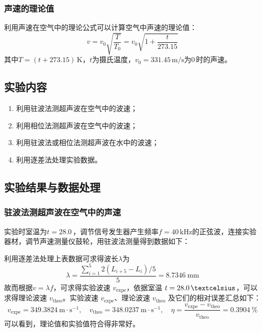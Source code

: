 \documentclass[UTF8]{article}
\theoremstyle{MyLineTheoremStyle} %
\theoremstyle{MyBlockTheoremStyle} %
\theoremstyle{MySubsubsectionStyle} %
\begin{document}
\subsubsection{声速的理论值}
利用声速在空气中的理论公式可以计算空气中声速的理论值：
\begin{equation}
v=v_0\sqrt{\frac{T}{T_0}}=v_0\sqrt{1+\frac{t}{273.15}}
\end{equation}
其中$ T=(t+273.15)\,\mathrm K $，$ t $为摄氏温度，$ v_0=331.45\,\mathrm{m/s} $为$ 0 $\,\textcelsius 时的声速。

\subsection{实验内容}
\begin{enumerate}
\item 利用驻波法测超声波在空气中的波速；
\item 利用相位法测超声波在空气中的波速；
\item 利用驻波法或相位法测超声波在水中的波速；
\item 利用逐差法处理实验数据。
\end{enumerate}

\subsection{实验结果与数据处理}
\subsubsection{驻波法测超声波在空气中的声速}
实验时室温为$ t=28.0 $\,\textcelsius，调节信号发生器产生频率$ f=40\,\mathrm{kHz} $的正弦波，连接实验器材，调节声速测量仪鼓轮，用驻波法测量得到数据如下：
\begin{table}[H]\centering
    \caption{驻波法求空气中声波波速}
    \label{驻波法求空气中声波波速}
\end{table}
利用逐差法处理上表数据可求得波长$ \lambda $为
\begin{equation}
\lambda=\frac{\sum_{i=1}^{5}2(L_{i+5}-L_i)/5}{5} = 8.7346 \ \mathrm{mm}
\end{equation}
故而根据$ v=\lambda f $，可求得实验波速 $v_{\text{expe}}$，依据室温 $t = 28.0 \,\textcelsius$，可以求得理论波速 $v_{\text{theo}}$。实验波速 $v_{\text{expe}}$、理论波速 $v_{\text{theo}}$ 及它们的相对误差汇总如下：
\begin{equation}
    v_{\text{expe}} = 349.3824 \ \mathrm{m \cdot s^{-1}},\quad 
    v_{\text{theo}} = 348.0237 \ \mathrm{m \cdot s^{-1}},\quad 
    \eta = \frac{v_{\text{expe}} - v_{\text{theo}}}{v_{\text{theo}}} = 0.3904\ \%
\end{equation}
可以看到，理论值和实验值符合得非常好。
\end{document}
